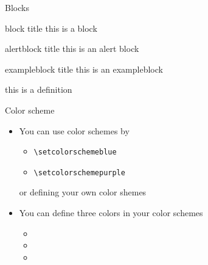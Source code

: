 \documentclass[13pt, dvipdfmx]{beamer}
\begin{document}
\begin{frame}[fragile]{Blocks}
    \begin{block}{block title}
        this is a block
    \end{block}

    \begin{alertblock}{alertblock title}
        this is an alert block
    \end{alertblock}
        
    \begin{exampleblock}{exampleblock title}
        this is an exampleblock
    \end{exampleblock}

    \begin{definition}
        this is a definition
    \end{definition}
\end{frame}


\begin{frame}[fragile]{Color scheme}
    \begin{itemize}
        
        \item You can use color schemes by
            \begin{itemize}
                \item \verb|\setcolorschemeblue|
                \item \verb|\setcolorschemepurple|
            \end{itemize}
            or defining your own color shemes

        \item You can define three colors in your color schemes
        \begin{itemize}
            \item \color{textcolor}{textcolor}
            \item \color{maincolor}{maincolor}
            \item \color{alertcolor}{alertcolor}
        \end{itemize}
    \end{itemize}
\end{frame}
\end{document}
